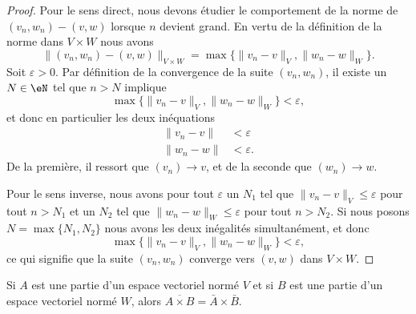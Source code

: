 \begin{proof}
	Pour le sens direct, nous devons étudier le comportement de la norme de \( (v_n,w_n)-(v,w)\) lorsque \( n\) devient grand. En vertu de la définition de la norme dans \( V\times W\) nous avons
	\begin{equation}
		\Big\| (v_n,w_n)-(v,w) \Big\|_{V\times W}=\max\big\{ \| v_n-v \|_V,\| w_n-w \|_W \big\}.
	\end{equation}
	Soit \( \varepsilon>0\). Par définition de la convergence de la suite \( (v_n,w_n)\), il existe un \( N\in\eN\) tel que \( n>N\) implique
	\begin{equation}
		\max\big\{ \| v_n-v \|_V,\| w_n-w \|_W \big\}<\varepsilon,
	\end{equation}
	et donc en particulier les deux inéquations
	\begin{subequations}
		\begin{align}
			\| v_n-v \| & <\varepsilon  \\
			\| w_n-w \| & <\varepsilon.
		\end{align}
	\end{subequations}
	De la première, il ressort que \( (v_n)\to v\), et de la seconde que \( (w_n)\to w\).

	Pour le sens inverse, nous avons pour tout \( \varepsilon\) un \( N_1\) tel que \( \| v_n-v \|_V\leq\varepsilon\) pour tout \( n>N_1\) et un \( N_2\) tel que \( \| w_n-w \|_W\leq\varepsilon\) pour tout \( n>N_2\). Si nous posons \( N=\max\{ N_1,N_2 \}\) nous avons les deux inégalités simultanément, et donc
	\begin{equation}
		\max\big\{ \| v_n-v \|_V,\| w_n-w \|_W \big\}<\varepsilon,
	\end{equation}
	ce qui signifie que la suite \( (v_n,w_n)\) converge vers \( (v,w)\) dans \( V\times W\).
\end{proof}

\begin{proposition}	\label{PROPooPESUooGAmqCW}
	Si $A$ est une partie d'un espace vectoriel normé $V$ et si $B$ est une partie d'un espace vectoriel normé $W$, alors $\overline{ A\times B }=\bar A\times \bar B$.
\end{proposition}

